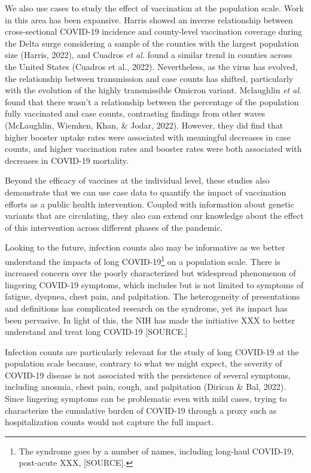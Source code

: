 \documentclass[12pt,twoside]{smiththesis}
\begin{document}
We also use cases to study the effect of vaccination at the population scale. Work in this area has been expansive. Harris showed an inverse relationship between cross-sectional COVID-19 incidence and county-level vaccination coverage during the Delta surge considering a sample of the counties with the largest population size (Harris, 2022), and Cuadros \emph{et al.} found a similar trend in counties across the United States (Cuadros et al., 2022). Nevertheless, as the virus has evolved, the relationship between transmission and case counts has shifted, particularly with the evolution of the highly transmissible Omicron variant. Mclaughlin \emph{et al.} found that there wasn't a relationship between the percentage of the population fully vaccinated and case counts, contrasting findings from other waves (McLaughlin, Wiemken, Khan, \& Jodar, 2022). However, they did find that higher booster uptake rates were associated with meaningful decreases in case counts, and higher vaccination rates and booster rates were both associated with decreases in COVID-19 mortality.

Beyond the efficacy of vaccines at the individual level, these studies also demonstrate that we can use case data to quantify the impact of vaccination efforts as a public health intervention. Coupled with information about genetic variants that are circulating, they also can extend our knowledge about the effect of this intervention across different phases of the pandemic.

Looking to the future, infection counts also may be informative as we better understand the impacts of long COVID-19\footnote{The syndrome goes by a number of names, including long-haul COVID-19, post-acute XXX, [SOURCE].} on a population scale. There is increased concern over the poorly characterized but widespread phenomenon of lingering COVID-19 symptoms, which includes but is not limited to symptoms of fatigue, dyspnea, chest pain, and palpitation. The heterogeneity of presentations and definitions has complicated research on the syndrome, yet its impact has been pervasive. In light of this, the NIH has made the initiative XXX to better understand and treat long COVID-19 {[}SOURCE.{]}

Infection counts are particularly relevant for the study of long COVID-19 at the population scale because, contrary to what we might expect, the severity of COVID-19 disease is not associated with the persistence of several symptoms, including anosmia, chest pain, cough, and palpitation (Dirican \& Bal, 2022). Since lingering symptoms can be problematic even with mild cases, trying to characterize the cumulative burden of COVID-19 through a proxy such as hospitalization counts would not capture the full impact.
\end{document}
